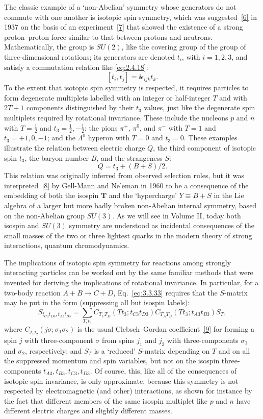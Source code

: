 The classic example of a `non-Abelian' symmetry whose generators do not commute
with one another is isotopic spin symmetry, which was suggested~\hyperref[ref:3.6]{[6]} in 1937 on the
basis of an experiment~\hyperref[ref:3.7]{[7]} that showed the existence of a strong proton--proton
force similar to that between protons and neutrons. Mathematically, the group is
$SU(2)$, like the covering group of the group of three-dimensional rotations; its
generators are denoted $t_i$, with $i=1,2,3$, and satisfy a commutation relation
like \eqref{eq:2.4.18}:
\[
[t_i,t_j]=\ii\epsilon_{ijk}t_k.
\]
To the extent that isotopic spin symmetry is respected, it requires particles to
form degenerate multiplets labelled with an integer or half-integer $T$ and with
$2T+1$ components distinguished by their $t_3$ values, just like the degenerate
spin multiplets required by rotational invariance. These include the nucleons $p$
and $n$ with $T=\tfrac12$ and $t_3=\tfrac12,-\tfrac12$; the pions $\pi^+$,
$\pi^0$, and $\pi^-$ with $T=1$ and $t_3=+1,0,-1$; and the $\Lambda^0$ hyperon
with $T=0$ and $t_3=0$. These examples illustrate the relation between electric
charge $Q$, the third component of isotopic spin $t_3$, the baryon number $B$, and
the strangeness $S$:
\[
Q=t_3+(B+S)/2.
\]
This relation was originally inferred from observed selection rules, but it was
interpreted~\hyperref[ref:3.8]{[8]} by Gell-Mann and Ne'eman in 1960 to be a consequence of the
embedding of both the isospin $\mathbf{T}$ and the `hypercharge' $Y\equiv B+S$ in
the Lie algebra of a larger but more badly broken non-Abelian internal symmetry,
based on the non-Abelian group $SU(3)$. As we will see in Volume II, today both
isospin and $SU(3)$ symmetry are understood as incidental consequences of the small
masses of the two or three lightest quarks in the modern theory of strong
interactions, quantum chromodynamics.

The implications of isotopic spin symmetry for reactions among strongly interacting
particles can be worked out by the same familiar methods that were invented for
deriving the implications of rotational invariance. In particular, for a two-body
reaction $A+B\to C+D$, Eq.~\eqref{eq:3.3.33} requires that the $S$-matrix may be put in the
form (suppressing all but isospin labels):
\[
S_{t_{C3}t_{D3},t_{A3}t_{B3}}
=\sum_{T,t_3}C_{T_CT_D}(Tt_3;t_{C3}t_{D3})
C_{T_AT_B}(Tt_3;t_{A3}t_{B3})S_T,
\]
where $C_{j_1j_2}(j\sigma;\sigma_1\sigma_2)$ is the usual Clebsch--Gordan
coefficient~\hyperref[ref:3.9]{[9]} for forming a spin $j$ with three-component $\sigma$ from spins
$j_1$ and $j_2$ with three-components $\sigma_1$ and $\sigma_2$, respectively;
and $S_T$ is a `reduced' $S$-matrix depending on $T$ and on all the suppressed
momentum and spin variables, but not on the isospin three-components
$t_{A3},t_{B3},t_{C3},t_{D3}$. Of course, this, like all of the consequences of
isotopic spin invariance, is only approximate, because this symmetry is not
respected by electromagnetic (and other) interactions, as shown for instance by
the fact that different members of the same isospin multiplet like $p$ and $n$
have different electric charges and slightly different masses.
